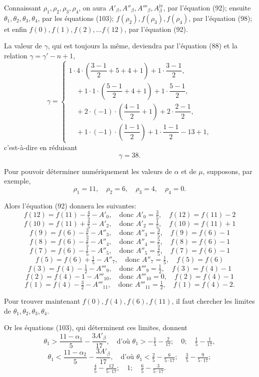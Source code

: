 \documentclass{article}
\begin{document}
Connaissant $\rho_1, \rho_2, \rho_3, \rho_4$, on aura $A'_\beta, A''_\beta, A'''_\beta, A^{\text{iv}}_\beta$, par l'équation (92); ensuite $\theta_1, \theta_2, \theta_3, \theta_4$, par les équations (103); $f(\rho_2), f(\rho_3), f(\rho_4)$, par l'équation (98); et enfin $f(0), f(1), f(2), \ldots f(12)$, par l'équation (92).

La valeur de $\gamma$, qui est toujours la même, deviendra par l'équation (88) et la relation $\gamma = \gamma'-n+1$,
\[ \gamma = \begin{cases}
1 \cdot 4 \cdot \left(\dfrac{3-1}{2}+5+4+1\right) + 1 \cdot \dfrac{3-1}{2}, \\
\quad + 1 \cdot 1 \cdot \left(\dfrac{5-1}{2}+4+1\right) + 1 \cdot \dfrac{5-1}{2}, \\
\quad + 2 \cdot (-1) \cdot \left(\dfrac{4-1}{2}+1\right) + 2 \cdot \dfrac{2-1}{2}, \\
\quad + 1 \cdot (-1) \cdot \left(\dfrac{1-1}{2}\right) + 1 \cdot \dfrac{1-1}{2} - 13 + 1,
\end{cases} \]
c'est-à-dire en réduisant
\[ \gamma = 38. \]

Pour pouvoir déterminer numériquement les valeurs de $\alpha$ et de $\mu$, supposons, par exemple,
\[ \rho_1 = 11, \quad \rho_2 = 6, \quad \rho_3 = 4, \quad \rho_4 = 0. \]

Alors l'équation (92) donnera les suivantes:
\[ f(12) = f(11) - \tfrac{4}{5} - A'_0, \quad \text{donc } A'_0 = \tfrac{3}{5}, \quad f(12) = f(11) - 2 \]
\[ f(10) = f(11) + \tfrac{4}{5} - A'_2, \quad \text{donc } A'_2 = \tfrac{1}{5}, \quad f(10) = f(11) + 1 \]
\[ f(9) = f(6) - \tfrac{3}{5} - A''_3, \quad \text{donc } A''_3 = \tfrac{3}{5}, \quad f(9) = f(6) - 1 \]
\[ f(8) = f(6) - \tfrac{2}{5} - A''_4, \quad \text{donc } A''_4 = \tfrac{5}{5}, \quad f(8) = f(6) - 1 \]
\[ f(7) = f(6) - \tfrac{1}{5} - A''_5, \quad \text{donc } A''_5 = \tfrac{4}{5}, \quad f(7) = f(6) - 1 \]
\[ f(5) = f(6) + \tfrac{1}{5} - A''_7, \quad \text{donc } A''_7 = \tfrac{1}{5}, \quad f(5) = f(6) \]
\[ f(3) = f(4) - \tfrac{1}{2} - A'''_9, \quad \text{donc } A'''_9 = \tfrac{1}{2}, \quad f(3) = f(4) - 1 \]
\[ f(2) = f(4) - 1 - A'''_{10}, \quad \text{donc } A'''_{10} = 0, \quad f(2) = f(4) - 1 \]
\[ f(1) = f(4) - \tfrac{3}{2} - A'''_{11}, \quad \text{donc } A'''_{11} = \tfrac{1}{2}, \quad f(1) = f(4) - 2. \]

Pour trouver maintenant $f(0), f(4), f(6), f(11)$, il faut chercher les limites de $\theta_1, \theta_2, \theta_3, \theta_4$.

Or les équations (103), qui déterminent ces limites, donnent
\[ \theta_1 > \frac{11-\alpha_1}{5} - \frac{3A'_\beta}{17}, \quad \text{d'où } \theta_1 > -\tfrac{1}{5} - \tfrac{2}{17}; \quad 0; \quad \tfrac{1}{5} - \tfrac{1}{17}, \]
\[ \theta_1 < \frac{11-\alpha_2}{5} - \frac{3A'_\beta}{17}, \quad \text{d'où } \theta_1 < \tfrac{2}{5} - \tfrac{6}{5 \cdot 17}; \quad \tfrac{3}{5} - \tfrac{9}{5 \cdot 17}; \]
\[ \tfrac{4}{5} - \tfrac{12}{5 \cdot 17}; \quad 1; \quad \tfrac{6}{5} - \tfrac{3}{5 \cdot 17}. \]
\end{document}
